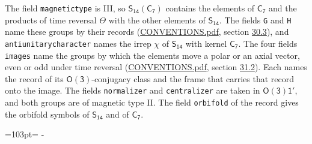 \documentclass[10pt,a4paper]{article}
\newcommand{\needspace}[1]{\par\penalty-100\begingroup\dimen0=#1\relax\dimen2=\pagegoal
  \advance\dimen2-\pagetotal\ifdim\dimen0>\dimen2\relax\ifdim\dimen2>0pt\vfil\break\fi\fi
  \endgroup}
\numberwithin{equation}{section}
\newcommand{\grp}[1]{\mathsf{#1}}
\begin{document}
The field \texttt{magnetictype} is III, so $\grp{S_{14}}(\grp{C_{7}})$ contains the elements of $\grp{C_{7}}$ and the products of time reversal $\varTheta$ with the other elements of $\grp{S_{14}}$. The fields \texttt{G} and \texttt{H} name these groups by their records (\href{../../CONVENTIONS.pdf}{CONVENTIONS.pdf}, section \href{../../CONVENTIONS.pdf\#conv.30.3}{30.3}), and \texttt{antiunitarycharacter} names the irrep $\chi$ of $\grp{S_{14}}$ with kernel $\grp{C_{7}}$. The four fields \texttt{images} name the groups by which the elements move a polar or an axial vector, even or odd under time reversal (\href{../../CONVENTIONS.pdf}{CONVENTIONS.pdf}, section \href{../../CONVENTIONS.pdf\#conv.31.2}{31.2}). Each names the record of its $\grp{O(3)}$-conjugacy class and the frame that carries that record onto the image. The fields \texttt{normalizer} and \texttt{centralizer} are taken in $\grp{O(3)1'}$, and both groups are of magnetic type II. The field \texttt{orbifold} of the record gives the orbifold symbols of $\grp{S_{14}}$ and of $\grp{C_{7}}$.
\needspace{103pt}
\end{document}
